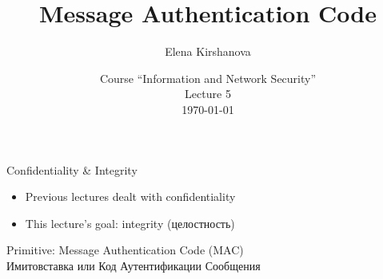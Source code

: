 \documentclass[usenames,dvipsnames, 9pt]{beamer}
\author{Elena Kirshanova \\ [10pt]
}
\title{\Huge Message Authentication Code}
\date{ Course ``Information and Network Security'' \\ 	
	Lecture 5 \\ \today }
\begin{document}
	
\begin{frame}
	\titlepage
\end{frame}


\begin{frame}{Confidentiality \& Integrity}
\LARGE 

\begin{itemize}
	\itemsep 1em
	\item Previous lectures dealt with {\color{Orange} confidentiality  }
	\item This lecture's goal:  {\color{Orange} integrity (целостность)}
\end{itemize}

\vspace{20pt}
\LARGE {\color{Orange}Primitive}: Message Authentication Code (MAC) \\[5pt]
Имитовставка или Код Аутентификации Сообщения


\end{frame}
\end{document}
